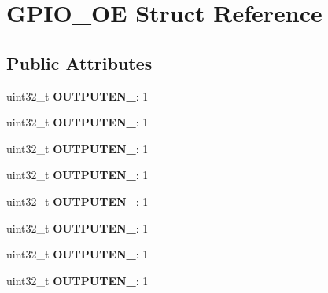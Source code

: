 \hypertarget{structGPIO__OE}{\section{G\-P\-I\-O\-\_\-\-O\-E Struct Reference}
\label{structGPIO__OE}
}
\subsection*{Public Attributes}
\begin{DoxyCompactItemize}
\item 
\hypertarget{structGPIO__OE_ad6887ebbc5ab59b6f77dd2f923c8e253}{uint32\-\_\-t {\bfseries O\-U\-T\-P\-U\-T\-E\-N\-\_}\-: 1}\label{structGPIO__OE_ad6887ebbc5ab59b6f77dd2f923c8e253}

\item 
\hypertarget{structGPIO__OE_a88d5fedbd63bb9362f05820dddb16321}{uint32\-\_\-t {\bfseries O\-U\-T\-P\-U\-T\-E\-N\-\_}\-: 1}\label{structGPIO__OE_a88d5fedbd63bb9362f05820dddb16321}

\item 
\hypertarget{structGPIO__OE_ad7de4e8a0c7bca6c0384c2c42899ff0e}{uint32\-\_\-t {\bfseries O\-U\-T\-P\-U\-T\-E\-N\-\_}\-: 1}\label{structGPIO__OE_ad7de4e8a0c7bca6c0384c2c42899ff0e}

\item 
\hypertarget{structGPIO__OE_ae49a0abe437096b49d3110634214611a}{uint32\-\_\-t {\bfseries O\-U\-T\-P\-U\-T\-E\-N\-\_}\-: 1}\label{structGPIO__OE_ae49a0abe437096b49d3110634214611a}

\item 
\hypertarget{structGPIO__OE_a5ca398738daaa21f6918404d45c2e399}{uint32\-\_\-t {\bfseries O\-U\-T\-P\-U\-T\-E\-N\-\_}\-: 1}\label{structGPIO__OE_a5ca398738daaa21f6918404d45c2e399}

\item 
\hypertarget{structGPIO__OE_aed2c6d63df4fee798a82c6581316cf37}{uint32\-\_\-t {\bfseries O\-U\-T\-P\-U\-T\-E\-N\-\_}\-: 1}\label{structGPIO__OE_aed2c6d63df4fee798a82c6581316cf37}

\item 
\hypertarget{structGPIO__OE_add97b682bc92d3434dbf36c1a62d295e}{uint32\-\_\-t {\bfseries O\-U\-T\-P\-U\-T\-E\-N\-\_}\-: 1}\label{structGPIO__OE_add97b682bc92d3434dbf36c1a62d295e}

\item 
\hypertarget{structGPIO__OE_a2a6ca1ce3cad08504f40ae788e6dff04}{uint32\-\_\-t {\bfseries O\-U\-T\-P\-U\-T\-E\-N\-\_}\-: 1}\label{structGPIO__OE_a2a6ca1ce3cad08504f40ae788e6dff04}


\end{DoxyCompactItemize}
